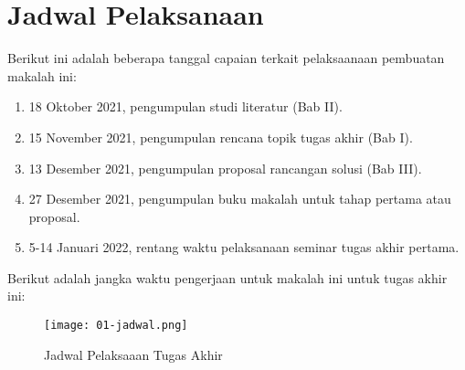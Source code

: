 \section{Jadwal Pelaksanaan}

Berikut ini adalah beberapa tanggal capaian terkait pelaksaanaan pembuatan makalah ini:

\begin{enumerate}
  \item 18 Oktober 2021, pengumpulan studi literatur (Bab II).
  \item 15 November 2021, pengumpulan rencana topik tugas akhir (Bab I).
  \item 13 Desember 2021, pengumpulan proposal rancangan solusi (Bab III).
  \item 27 Desember 2021, pengumpulan buku makalah untuk tahap pertama atau proposal.
  \item 5-14 Januari 2022, rentang waktu pelaksanaan seminar tugas akhir pertama.
\end{enumerate}

Berikut adalah jangka waktu pengerjaan untuk makalah ini untuk tugas akhir ini:

\begin{figure}[ht]
  \centering
  \texttt{[image: 01-jadwal.png]}
  \caption{Jadwal Pelaksaaan Tugas Akhir}
\end{figure}


    

